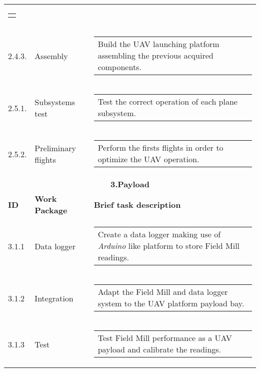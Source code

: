 \begin{longtable}[htb]{@{}lll@{}}
\begin{tabular}[c]{@{}l@{}}
\begin{minipage}[t]{0.7\linewidth}
		\end{minipage}
	\end{tabular} \\
	2.4.3.& Assembly& \begin{tabular}[c]{@{}l@{}}
		\begin{minipage}[t]{0.7\linewidth}
			Build the UAV launching platform assembling the previous acquired components. 
		\end{minipage}
	\end{tabular} \\
	2.5.1.& Subsystems test& \begin{tabular}[c]{@{}l@{}}
		\begin{minipage}[t]{0.7\linewidth}
			Test the correct operation of each plane subsystem.
		\end{minipage}
	\end{tabular} \\
	2.5.2.& Preliminary flights& \begin{tabular}[c]{@{}l@{}}
		\begin{minipage}[t]{0.7\linewidth}
			Perform the firsts flights in order to optimize the UAV operation.
		\end{minipage}
	\end{tabular} \\
	\midrule[2pt]
\multicolumn{3}{c}{\textbf{\large 3.Payload} }\\ \midrule[2pt]
\textbf{ID} & \textbf{Work Package} &\textbf{Brief task description}\\ \midrule[1pt]
	3.1.1& Data logger& \begin{tabular}[c]{@{}l@{}}
		\begin{minipage}[t]{0.7\linewidth}
			Create a data logger making use of \textit{Arduino} like platform to store Field Mill readings.
		\end{minipage}
	\end{tabular} \\
	3.1.2& Integration& \begin{tabular}[c]{@{}l@{}}
		\begin{minipage}[t]{0.7\linewidth}
			Adapt the Field Mill and data logger system to the UAV platform payload bay.
		\end{minipage}
	\end{tabular} \\
	3.1.3& Test& \begin{tabular}[c]{@{}l@{}}
		\begin{minipage}[t]{0.7\linewidth}
			Test Field Mill performance as a UAV payload and calibrate the readings. 

\end{minipage}
\end{tabular}
\end{longtable}
